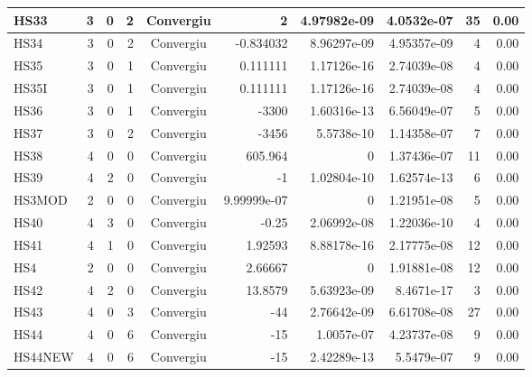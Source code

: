 \begin{center}
\begin{longtable}{|l|r|r|r|c|r|r|r|r|r|}
    HS33 &      3 &      0 &      2 & Convergiu  &           2 &    4.97982e-09 &  4.0532e-07 &     35 &    0.00 \\ \hline
    HS34 &      3 &      0 &      2 & Convergiu  &   -0.834032 &    8.96297e-09 & 4.95357e-09 &      4 &    0.00 \\ \hline
    HS35 &      3 &      0 &      1 & Convergiu  &    0.111111 &    1.17126e-16 & 2.74039e-08 &      4 &    0.00 \\ \hline
   HS35I &      3 &      0 &      1 & Convergiu  &    0.111111 &    1.17126e-16 & 2.74039e-08 &      4 &    0.00 \\ \hline
    HS36 &      3 &      0 &      1 & Convergiu  &       -3300 &    1.60316e-13 & 6.56049e-07 &      5 &    0.00 \\ \hline
    HS37 &      3 &      0 &      2 & Convergiu  &       -3456 &     5.5738e-10 & 1.14358e-07 &      7 &    0.00 \\ \hline
    HS38 &      4 &      0 &      0 & Convergiu  &     605.964 &              0 & 1.37436e-07 &     11 &    0.00 \\ \hline
    HS39 &      4 &      2 &      0 & Convergiu  &          -1 &    1.02804e-10 & 1.62574e-13 &      6 &    0.00 \\ \hline
  HS3MOD &      2 &      0 &      0 & Convergiu  & 9.99999e-07 &              0 & 1.21951e-08 &      5 &    0.00 \\ \hline
    HS40 &      4 &      3 &      0 & Convergiu  &       -0.25 &    2.06992e-08 & 1.22036e-10 &      4 &    0.00 \\ \hline
    HS41 &      4 &      1 &      0 & Convergiu  &     1.92593 &    8.88178e-16 & 2.17775e-08 &     12 &    0.00 \\ \hline
     HS4 &      2 &      0 &      0 & Convergiu  &     2.66667 &              0 & 1.91881e-08 &     12 &    0.00 \\ \hline
    HS42 &      4 &      2 &      0 & Convergiu  &     13.8579 &    5.63923e-09 &  8.4671e-17 &      3 &    0.00 \\ \hline
    HS43 &      4 &      0 &      3 & Convergiu  &         -44 &    2.76642e-09 & 6.61708e-08 &     27 &    0.00 \\ \hline
    HS44 &      4 &      0 &      6 & Convergiu  &         -15 &     1.0057e-07 & 4.23737e-08 &      9 &    0.00 \\ \hline
 HS44NEW &      4 &      0 &      6 & Convergiu  &         -15 &    2.42289e-13 &  5.5479e-07 &      9 &    0.00 \\ \hline

\end{longtable}
\end{center}
